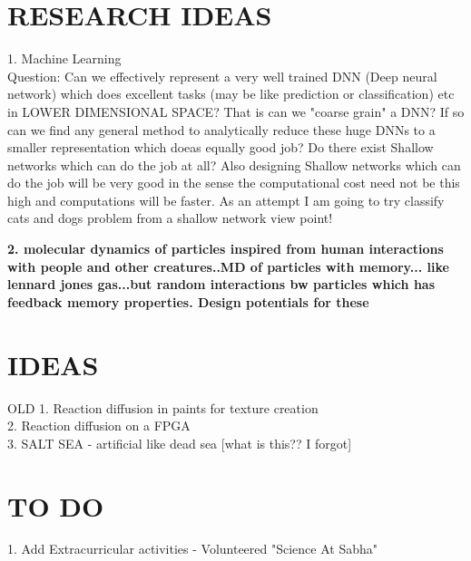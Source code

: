 \documentclass[12pt]{article}
\begin{document}
\section{RESEARCH IDEAS}
1. Machine Learning \\
Question: Can we effectively represent a very well trained DNN (Deep neural network) which does excellent tasks (may be like prediction or classification) etc in LOWER DIMENSIONAL SPACE? That is can we "coarse grain" a DNN? If so can we find any general method to analytically reduce these huge DNNs to a smaller representation which doeas equally good job? Do there exist Shallow networks which can do the job at all? Also designing Shallow networks which can do the job will be very good in the sense the computational cost need not be this high and computations will be faster. As an attempt I am going to try classify cats and dogs problem from a shallow network view point!

\textbf{2. molecular dynamics of particles inspired from human interactions with people and other creatures..MD of particles with memory... like lennard jones gas...but random interactions bw particles which has feedback memory properties. Design potentials for these }
\section{IDEAS}
OLD
1. Reaction diffusion in paints for texture creation \\
2. Reaction diffusion on a FPGA \\
3. SALT SEA - artificial like dead sea [what is this?? I forgot] \\


     \section{TO DO}

1. Add Extracurricular activities - Volunteered "Science At Sabha" 
\end{document}
